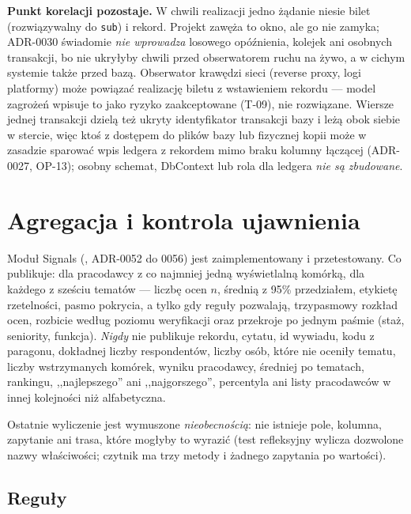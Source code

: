 \textbf{Punkt korelacji pozostaje.} W chwili realizacji jedno żądanie niesie
bilet (rozwiązywalny do \texttt{sub}) i rekord. Projekt zawęża to okno, ale go nie
zamyka; ADR-0030 świadomie \emph{nie wprowadza} losowego opóźnienia, kolejek ani
osobnych transakcji, bo nie ukryłyby chwili przed obserwatorem ruchu na żywo, a w cichym
systemie także przed bazą. Obserwator krawędzi sieci (reverse proxy, logi
platformy) może powiązać realizację biletu z wstawieniem rekordu --- model
zagrożeń wpisuje to jako ryzyko zaakceptowane (T-09), nie rozwiązane. Wiersze jednej
transakcji dzielą też ukryty identyfikator transakcji bazy i leżą obok siebie w
stercie, więc ktoś z dostępem do plików bazy lub fizycznej kopii może w
zasadzie sparować wpis ledgera z rekordem mimo braku kolumny łączącej (ADR-0027,
OP-13); osobny schemat, DbContext lub rola dla ledgera \emph{nie są zbudowane}.

\section{Agregacja i kontrola ujawnienia}
\label{sec:p3-agregacja}

Moduł Signals (, ADR-0052 do 0056) jest
zaimplementowany i przetestowany. Co publikuje: dla pracodawcy z co najmniej jedną
wyświetlalną komórką, dla każdego z sześciu tematów --- liczbę ocen $n$, średnią z
95\% przedziałem, etykietę rzetelności, pasmo pokrycia, a tylko gdy reguły
pozwalają, trzypasmowy rozkład ocen, rozbicie według poziomu weryfikacji oraz
przekroje po jednym paśmie (staż, seniority, funkcja). \emph{Nigdy} nie publikuje
rekordu, cytatu, id wywiadu, kodu z paragonu, dokładnej liczby respondentów,
liczby osób, które nie oceniły tematu, liczby wstrzymanych komórek, wyniku
pracodawcy, średniej po tematach, rankingu, ,,najlepszego'' ani ,,najgorszego'',
percentyla ani listy pracodawców w innej kolejności niż alfabetyczna.

Ostatnie wyliczenie jest wymuszone \emph{nieobecnością}: nie istnieje pole,
kolumna, zapytanie ani trasa, które mogłyby to wyrazić (test refleksyjny wylicza
dozwolone nazwy właściwości; czytnik ma trzy metody i żadnego zapytania po
wartości).

\subsection{Reguły}

